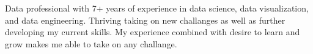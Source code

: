 

\begin{cvparagraph}

Data professional with 7+ years of experience in data science, data visualization, and data engineering. Thriving taking on new challanges as well as further developing my current skills. My experience combined with desire to learn and grow makes me able to take on any challange. 
\end{cvparagraph}
